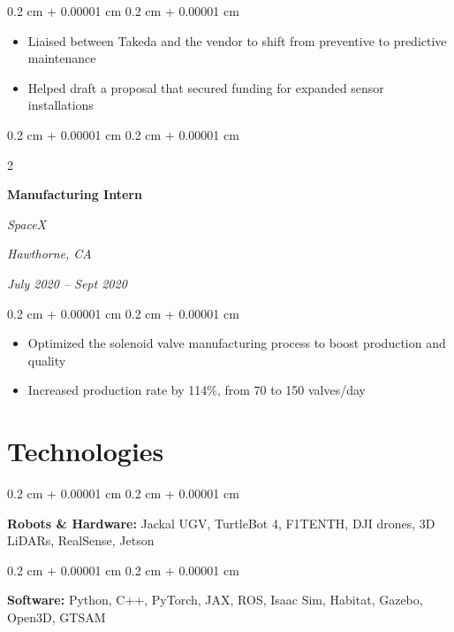 \documentclass[10pt, letterpaper]{article}
\newenvironment{highlights}{
    \begin{itemize}[
        topsep=0.10 cm,
        parsep=0.10 cm,
        partopsep=0pt,
        itemsep=0pt,
        leftmargin=0.4 cm + 10pt
    ]
}{
    \end{itemize}
} %
\newenvironment{onecolentry}{
    \begin{adjustwidth}{
        0.2 cm + 0.00001 cm
    }{
        0.2 cm + 0.00001 cm
    }
}{
    \end{adjustwidth}
} %
\newenvironment{twocolentry}[2][]{
    \needspace{5\baselineskip}%
    \onecolentry
    \def\secondColumn{#2}
    \setcolumnwidth{\fill, 4.5 cm}
    \begin{paracol}{2}
}{
    \switchcolumn \raggedleft \secondColumn
    \end{paracol}
    \endonecolentry
} %
\begin{document}
        \vspace{0.10 cm}
        \begin{onecolentry}
            \begin{highlights}
                \item Liaised between Takeda and the vendor to shift from preventive to predictive maintenance
                \item Helped draft a proposal that secured funding for expanded sensor installations
            \end{highlights}
        \end{onecolentry}

        \vspace{0.2 cm}

\begin{twocolentry}{
        \textit{Hawthorne, CA}    
            
        \textit{July 2020 – Sept 2020}}
            \textbf{Manufacturing Intern}
            
            \textit{SpaceX}
        \end{twocolentry}

        \vspace{0.10 cm}
        \begin{onecolentry}
            \begin{highlights}
                \item Optimized the solenoid valve manufacturing process to boost production and quality
                \item Increased production rate by 114\%, from 70 to 150 valves/day
            \end{highlights}
        \end{onecolentry}



    

    \section{Technologies}

\begin{onecolentry}
    \textbf{Robots \& Hardware:} Jackal UGV, TurtleBot 4, F1TENTH, DJI drones, 3D LiDARs, RealSense, Jetson
\end{onecolentry}

\vspace{0.2 cm}

\begin{onecolentry}
    \textbf{Software:} Python, C++, PyTorch, JAX, ROS, Isaac Sim, Habitat, Gazebo, Open3D, GTSAM
\end{onecolentry}
\end{document}
